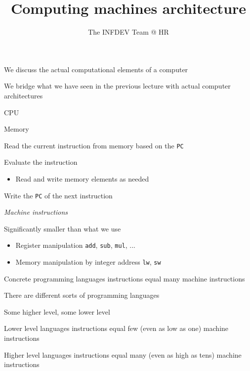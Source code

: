 \documentclass{beamer}
\title{Computing machines architecture}
\author{The INFDEV Team @ HR}
\institute{Hogeschool Rotterdam \\ 
Rotterdam, Netherlands}
\date{}
\begin{document}
\maketitle

\begin{slide}{
\item We discuss the actual computational elements of a computer
\item We bridge what we have seen in the previous lecture with actual computer architectures
}\end{slide}

\begin{slide}{
\item CPU
\item Memory
}\end{slide}

\begin{slide}{
\item Read the current instruction from memory based on the \texttt{PC}
\item Evaluate the instruction
\begin{itemize}
\item Read and write memory elements as needed
\end{itemize}
\item Write the \texttt{PC} of the next instruction
}\end{slide}

\begin{slide}{
\item \textit{Machine instructions}
\item Significantly smaller than what we use
\begin{itemize}
\item Register manipulation \texttt{add}, \texttt{sub}, \texttt{mul}, ...
\item Memory manipulation by integer address \texttt{lw}, \texttt{sw}
\end{itemize}
\item Concrete programming languages instructions equal many machine instructions
}\end{slide}

\begin{slide}{
\item There are different sorts of programming languages
\item Some higher level, some lower level
\item Lower level languages instructions equal few (even as low as one) machine instructions
\pause
\item Higher level languages instructions equal many (even as high as tens) machine instructions
}\end{slide}
\end{document}
